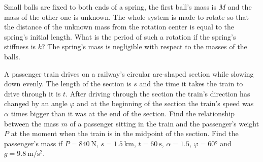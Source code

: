 \documentclass[11pt]{article}
\begin{document}
\probeng
Small balls are fixed to both ends of a spring, the first ball’s mass is $M$ and the mass of the other one is unknown. The whole system is made to rotate so that the distance of the unknown mass from the rotation center is equal to the spring’s initial length. What is the period of such a rotation if the spring’s stiffness is $k$? The spring’s mass is negligible with respect to the masses of the balls.
\probend
\bigskip


\probeng
A passenger train drives on a railway’s circular arc-shaped section while slowing down evenly. The length of the section is $s$ and the time it takes the train to drive through it is $t$. After driving through the section the train’s direction has changed by an angle $\varphi$ and at the beginning of the section the train’s speed was $\alpha$ times bigger than it was at the end of the section. Find the relationship between the mass $m$ of a passenger sitting in the train and the passenger’s weight $P$ at the moment when the train is in the midpoint of the section. Find the passenger’s mass if $P=\SI{840}{\newton}$, $s=\SI{1.5}{\kilo\meter}$, $t=\SI{60}{\second}$, $\alpha=\num{1.5}$, $\varphi=\ang{60}$ and $g=\SI{9.8}{\meter\per\second\squared}$.
\probend
\bigskip

\end{document}
